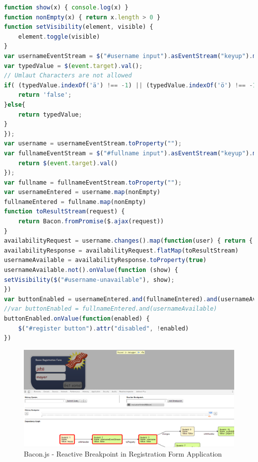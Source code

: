\begin{lstlisting}[language=JavaScript, caption=Bacon.js - Registration Form, label={lst:evaluation-bacon_regform}]
function show(x) { console.log(x) }
function nonEmpty(x) { return x.length > 0 }
function setVisibility(element, visible) {
	element.toggle(visible)
}
var usernameEventStream = $("#username input").asEventStream("keyup").map(function (event) {
var typedValue = $(event.target).val();
// Umlaut Characters are not allowed
if( (typedValue.indexOf('ä') !== -1) || (typedValue.indexOf('ö') !== -1) || (typedValue.indexOf('ü') !== -1)){
	return 'false';
}else{
	return typedValue;
}
});
var username = usernameEventStream.toProperty("");
var fullnameEventStream = $("#fullname input").asEventStream("keyup").map(function (event) {
	return $(event.target).val()
});
var fullname = fullnameEventStream.toProperty("");
var usernameEntered = username.map(nonEmpty)
fullnameEntered = fullname.map(nonEmpty)
function toResultStream(request) {
	return Bacon.fromPromise($.ajax(request))
}
availabilityRequest = username.changes().map(function(user) { return { url: "/test.php?uname=" + user }});
availabilityResponse = availabilityRequest.flatMap(toResultStream)
usernameAvailable = availabilityResponse.toProperty(true)
usernameAvailable.not().onValue(function (show) {
setVisibility($("#username-unavailable"), show);
})
var buttonEnabled = usernameEntered.and(fullnameEntered).and(usernameAvailable)
//var buttonEnabled = fullnameEntered.and(usernameAvailable)
buttonEnabled.onValue(function(enabled) {
	$("#register button").attr("disabled", !enabled)
})
\end{lstlisting}

\begin{figure}[!h]
	\centering
	\includegraphics[width=\textwidth,height=\textheight,keepaspectratio]{gfx/evaluation/reg_form_reactive_bpoint.png}
	\caption{Bacon.js - Reactive Breakpoint in Registration Form Application}
	\label{fig:reg_form_reactive_bpoint}
\end{figure}

